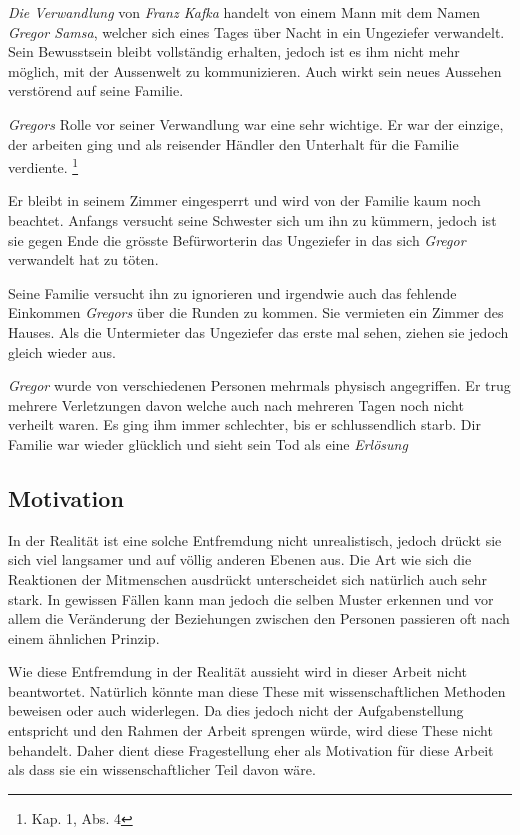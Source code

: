 \documentclass[12pt,a4paper,twoside,titlepage]{article}
\begin{document}
	\textit{Die Verwandlung} von \textit{Franz Kafka} handelt von einem Mann mit dem Namen \textit{Gregor Samsa}, welcher sich eines Tages über Nacht in ein Ungeziefer verwandelt. Sein Bewusstsein bleibt vollständig erhalten, jedoch ist es ihm nicht mehr möglich, mit der Aussenwelt zu kommunizieren. Auch wirkt sein neues Aussehen verstörend auf seine Familie.
	
	\textit{Gregors} Rolle vor seiner Verwandlung war eine sehr wichtige. Er war der einzige, der arbeiten ging und als reisender Händler den Unterhalt für die Familie verdiente. \footnote{\cite{verwandlung} Kap. 1, Abs. 4}
	
	Er bleibt in seinem Zimmer eingesperrt und wird von der Familie kaum noch beachtet. Anfangs versucht seine Schwester sich um ihn zu kümmern, jedoch ist sie gegen Ende die grösste Befürworterin das Ungeziefer in das sich \textit{Gregor} verwandelt hat zu töten.
	
	Seine Familie versucht ihn zu ignorieren und irgendwie auch das fehlende Einkommen \textit{Gregors} über die Runden zu kommen. Sie vermieten ein Zimmer des Hauses. Als die Untermieter das Ungeziefer das erste mal sehen, ziehen sie jedoch gleich wieder aus.
	
	\textit{Gregor} wurde von verschiedenen Personen mehrmals physisch angegriffen. Er trug mehrere Verletzungen davon welche auch nach mehreren Tagen noch nicht verheilt waren. Es ging ihm immer schlechter, bis er schlussendlich starb. Dir Familie war wieder glücklich und sieht sein Tod als eine \textit{Erlösung}
	
	\subsection{Motivation}
	
	In der Realität ist eine solche Entfremdung nicht unrealistisch, jedoch drückt sie sich viel langsamer und auf völlig anderen Ebenen aus. Die Art wie sich die Reaktionen der Mitmenschen ausdrückt unterscheidet sich natürlich auch sehr stark. In gewissen Fällen kann man jedoch die selben Muster erkennen und vor allem die Veränderung der Beziehungen zwischen den Personen passieren oft nach einem ähnlichen Prinzip. 
	
	Wie diese Entfremdung in der Realität aussieht wird in dieser Arbeit nicht beantwortet. Natürlich könnte man diese These mit wissenschaftlichen Methoden beweisen oder auch widerlegen. Da dies jedoch nicht der Aufgabenstellung entspricht und den Rahmen der Arbeit sprengen würde, wird diese These nicht behandelt. Daher dient diese Fragestellung eher als Motivation für diese Arbeit als dass sie ein wissenschaftlicher Teil davon wäre.
	
\end{document}
